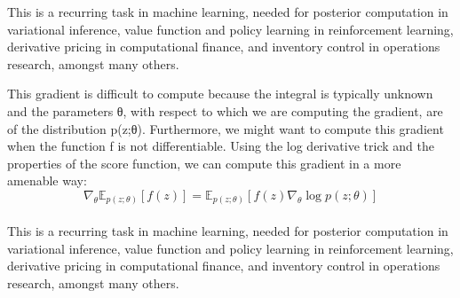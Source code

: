 \documentclass[12pt,a4paper]{article}
\begin{document}
This is a recurring task in machine learning, needed for posterior computation in variational inference, value function and policy learning in reinforcement learning, derivative pricing in computational finance, and inventory control in operations research, amongst many others.

This gradient is difficult to compute because the integral is typically unknown and the parameters θ, with respect to which we are computing the gradient, are of the distribution p(z;θ). Furthermore, we might want to compute this gradient when the function f is not differentiable. Using the log derivative trick and the properties of the score function, we can compute this gradient in a more amenable way:\\
$$\nabla_\theta \mathbb{E}_{p(z;\theta)}[f(z)] = \mathbb{E}_{p(z;\theta)}[f(z)\nabla_\theta \log p(z;\theta)]$$\\
This is a recurring task in machine learning, needed for posterior computation in variational inference, value function and policy learning in reinforcement learning, derivative pricing in computational finance, and inventory control in operations research, amongst many others.
\end{document}
